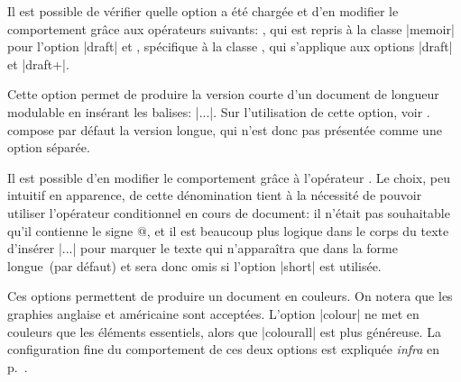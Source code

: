\begin{developer}
Il est possible de vérifier quelle option a été chargée et d'en modifier le comportement grâce aux opérateurs suivants: , qui est repris à la classe |memoir| pour l'option |draft| et , spécifique à la classe \frenchlaw, qui s'applique aux options |draft| et |draft+|.
\end{developer}

\begin{noprint}
\end{noprint}

Cette option permet de produire la version courte d'un document de longueur modulable en insérant les balises: |\iflong...\fi|. Sur l'utilisation de cette option, voir . \frenchlaw compose par défaut la version longue, qui n'est donc pas présentée comme une option séparée.

\begin{developer}
Il est possible d'en modifier le comportement grâce à l'opérateur . Le choix, peu intuitif en apparence, de cette dénomination tient à la nécessité de pouvoir utiliser l'opérateur conditionnel en cours de document: il n'était pas souhaitable qu'il contienne le signe @, et il est beaucoup plus logique dans le corps du texte d'insérer |\iflong...\fi| pour marquer le texte qui n'apparaîtra que dans la forme longue~(par défaut) et sera donc omis si l'option |short| est utilisée.
\end{developer}

\begin{noprint}
\end{noprint}

Ces options permettent de produire un document en couleurs. On notera que les graphies anglaise et américaine sont acceptées. L'option |colour| ne met en couleurs que les éléments essentiels, alors que |colourall| est plus généreuse. La configuration fine du comportement de ces deux options est expliquée \emph{infra} en p.~\pageref{Couleurs}.

